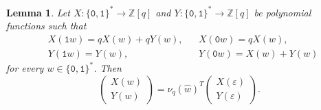 \documentclass[a4paper,12pt]{amsart}
\newtheorem{lemma}[definition]{Lemma}
\newcommand{\Z}{\mathbb{Z}}
\newcommand{\0}{\mathtt{0}}
\newcommand{\1}{\mathtt{1}}
\newcommand{\2}{\mathtt{2}}
\newcommand{\3}{\mathtt{3}}
\begin{document}
    \begin{lemma}\label{lem:sufficient-conditions-to-be-described-by-Fq}
        Let
        $X:\{\0,\1\}^*\to\Z[q]$ and
        $Y:\{\0,\1\}^*\to\Z[q]$ be polynomial functions such that
        \begin{equation*}%
        \begin{aligned}
            &X(\1 w) =qX(w)+qY(w),
            &&X(\0 w) =qX(w),\\
            &Y(\1 w)  =Y(w),
            &&Y(\0 w)  =X(w)+Y(w)
        \end{aligned}
        \end{equation*}
        for every $w\in\{\0,\1\}^*$.
        Then
        \begin{equation}\label{eq:XY-in-terms-of-Fq}
            \left(\begin{array}{r}
            X(w)\\
            Y(w)
            \end{array}\right)
            =
            \nu_q(\widehat{w})^T
            \left(\begin{array}{r}
                X(\varepsilon)\\
                Y(\varepsilon)
            \end{array}\right).
        \end{equation}
    \end{lemma}
\end{document}
